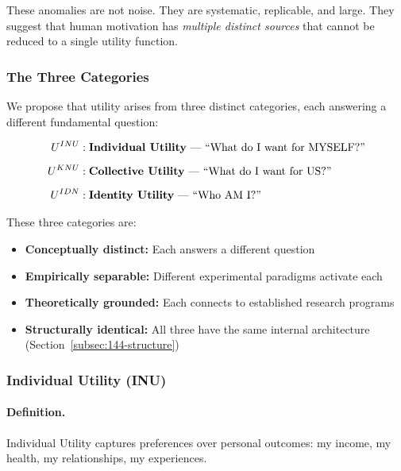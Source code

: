 These anomalies are not noise. They are systematic, replicable, and large.
They suggest that human motivation has \emph{multiple distinct sources}
that cannot be reduced to a single utility function.

\subsubsection{The Three Categories}

We propose that utility arises from three distinct categories,
each answering a different fundamental question:

\begin{definition}
\label{def:three-categories}
\begin{align}
U^{INU} &: \text{\textbf{Individual Utility} --- ``What do I want for MYSELF?''} \\[0.5em]
U^{KNU} &: \text{\textbf{Collective Utility} --- ``What do I want for US?''} \\[0.5em]
U^{IDN} &: \text{\textbf{Identity Utility} --- ``Who AM I?''}
\end{align}
\end{definition}

These three categories are:
\begin{itemize}
\item \textbf{Conceptually distinct:} Each answers a different question
\item \textbf{Empirically separable:} Different experimental paradigms activate each
\item \textbf{Theoretically grounded:} Each connects to established research programs
\item \textbf{Structurally identical:} All three have the same internal architecture (Section~\ref{subsec:144-structure})
\end{itemize}

\subsubsection{Individual Utility (INU)}

\paragraph{Definition.}
Individual Utility captures preferences over personal outcomes:
my income, my health, my relationships, my experiences.

